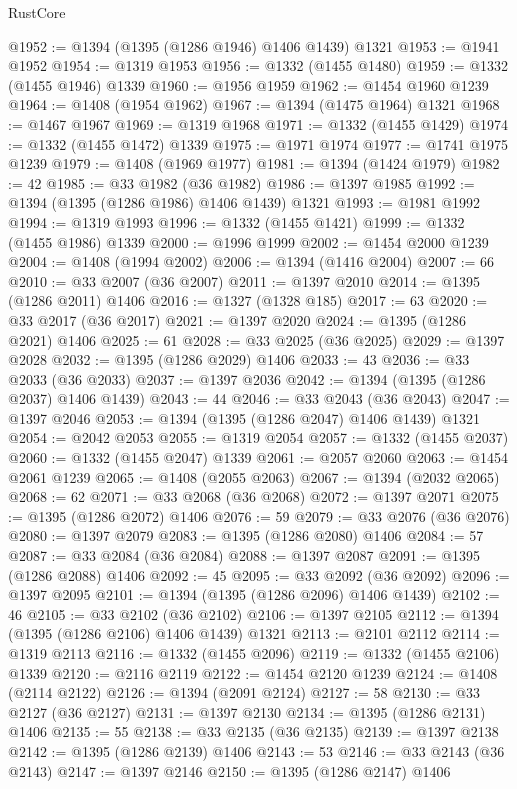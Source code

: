 \begin{lexlean}{RustCore}
\begin{coremodule}
@1952 := @1394 (@1395 (@1286 @1946) @1406 @1439) @1321
@1953 := @1941 @1952
@1954 := @1319 @1953
@1956 := @1332 (@1455 @1480)
@1959 := @1332 (@1455 @1946) @1339
@1960 := @1956 @1959
@1962 := @1454 @1960 @1239
@1964 := @1408 (@1954 @1962)
@1967 := @1394 (@1475 @1964) @1321
@1968 := @1467 @1967
@1969 := @1319 @1968
@1971 := @1332 (@1455 @1429)
@1974 := @1332 (@1455 @1472) @1339
@1975 := @1971 @1974
@1977 := @1741 @1975 @1239
@1979 := @1408 (@1969 @1977)
@1981 := @1394 (@1424 @1979)
@1982 := 42
@1985 := @33 @1982 (@36 @1982)
@1986 := @1397 @1985
@1992 := @1394 (@1395 (@1286 @1986) @1406 @1439) @1321
@1993 := @1981 @1992
@1994 := @1319 @1993
@1996 := @1332 (@1455 @1421)
@1999 := @1332 (@1455 @1986) @1339
@2000 := @1996 @1999
@2002 := @1454 @2000 @1239
@2004 := @1408 (@1994 @2002)
@2006 := @1394 (@1416 @2004)
@2007 := 66
@2010 := @33 @2007 (@36 @2007)
@2011 := @1397 @2010
@2014 := @1395 (@1286 @2011) @1406
@2016 := @1327 (@1328 @185)
@2017 := 63
@2020 := @33 @2017 (@36 @2017)
@2021 := @1397 @2020
@2024 := @1395 (@1286 @2021) @1406
@2025 := 61
@2028 := @33 @2025 (@36 @2025)
@2029 := @1397 @2028
@2032 := @1395 (@1286 @2029) @1406
@2033 := 43
@2036 := @33 @2033 (@36 @2033)
@2037 := @1397 @2036
@2042 := @1394 (@1395 (@1286 @2037) @1406 @1439)
@2043 := 44
@2046 := @33 @2043 (@36 @2043)
@2047 := @1397 @2046
@2053 := @1394 (@1395 (@1286 @2047) @1406 @1439) @1321
@2054 := @2042 @2053
@2055 := @1319 @2054
@2057 := @1332 (@1455 @2037)
@2060 := @1332 (@1455 @2047) @1339
@2061 := @2057 @2060
@2063 := @1454 @2061 @1239
@2065 := @1408 (@2055 @2063)
@2067 := @1394 (@2032 @2065)
@2068 := 62
@2071 := @33 @2068 (@36 @2068)
@2072 := @1397 @2071
@2075 := @1395 (@1286 @2072) @1406
@2076 := 59
@2079 := @33 @2076 (@36 @2076)
@2080 := @1397 @2079
@2083 := @1395 (@1286 @2080) @1406
@2084 := 57
@2087 := @33 @2084 (@36 @2084)
@2088 := @1397 @2087
@2091 := @1395 (@1286 @2088) @1406
@2092 := 45
@2095 := @33 @2092 (@36 @2092)
@2096 := @1397 @2095
@2101 := @1394 (@1395 (@1286 @2096) @1406 @1439)
@2102 := 46
@2105 := @33 @2102 (@36 @2102)
@2106 := @1397 @2105
@2112 := @1394 (@1395 (@1286 @2106) @1406 @1439) @1321
@2113 := @2101 @2112
@2114 := @1319 @2113
@2116 := @1332 (@1455 @2096)
@2119 := @1332 (@1455 @2106) @1339
@2120 := @2116 @2119
@2122 := @1454 @2120 @1239
@2124 := @1408 (@2114 @2122)
@2126 := @1394 (@2091 @2124)
@2127 := 58
@2130 := @33 @2127 (@36 @2127)
@2131 := @1397 @2130
@2134 := @1395 (@1286 @2131) @1406
@2135 := 55
@2138 := @33 @2135 (@36 @2135)
@2139 := @1397 @2138
@2142 := @1395 (@1286 @2139) @1406
@2143 := 53
@2146 := @33 @2143 (@36 @2143)
@2147 := @1397 @2146
@2150 := @1395 (@1286 @2147) @1406

\end{coremodule}
\end{lexlean}
